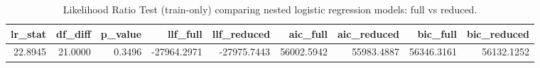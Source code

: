 \begin{table}[H]
\begin{center}
\begin{tabular}{rrrrrrrrr}
\toprule
lr_stat & df_diff & p_value & llf_full & llf_reduced & aic_full & aic_reduced & bic_full & bic_reduced \\
\midrule
22.8945 & 21.0000 & 0.3496 & -27964.2971 & -27975.7443 & 56002.5942 & 55983.4887 & 56346.3161 & 56132.1252 \\
\bottomrule
\end{tabular}
\end{center}
\vspace{-5pt}
\caption{Likelihood Ratio Test (train-only) comparing nested logistic regression models: full vs reduced.}
\label{tab:lrt_full_vs_reduced}
\end{table}
